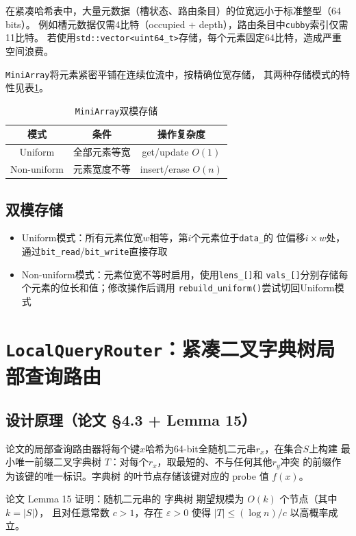 \documentclass[
    type = bachelor,
    fontset = win,
    decl-page = true,
  ]{njuthesis}
\begin{document}
在紧凑哈希表中，大量元数据（槽状态、路由条目）的位宽远小于标准整型（64 bits）。
例如槽元数据仅需4比特（occupied + depth），路由条目中\texttt{cubby}索引仅需11比特。
若使用\texttt{std::vector<uint64\_t>}存储，每个元素固定64比特，造成严重空间浪费。

\texttt{MiniArray}将元素紧密平铺在连续位流中，按精确位宽存储\cite{1}，
其两种存储模式的特性见表\ref{tab:miniarray}。

\begin{table}[H]
\centering
\begin{tabular}{c|c|c}
\toprule
模式 & 条件 & 操作复杂度 \\
\midrule
Uniform & 全部元素等宽 & get/update $O(1)$ \\
Non-uniform & 元素宽度不等 & insert/erase $O(n)$ \\
\bottomrule
\end{tabular}
\caption{\texttt{MiniArray}双模存储}
\label{tab:miniarray}
\end{table}

\subsection{双模存储}
\begin{itemize}
  \item Uniform模式：所有元素位宽$w$相等，第$i$个元素位于\texttt{data\_}的
    位偏移$i \times w$处，通过\texttt{bit\_read}/\texttt{bit\_write}直接存取
  \item Non-uniform模式：元素位宽不等时启用，使用\texttt{lens\_[]}和
    \texttt{vals\_[]}分别存储每个元素的位长和值；修改操作后调用
    \texttt{rebuild\_uniform()}尝试切回Uniform模式
\end{itemize}

\section{\texttt{LocalQueryRouter}：紧凑二叉字典树局部查询路由}

\subsection{设计原理（论文 \S4.3 + Lemma 15）}

论文\cite{1}的局部查询路由器将每个键$x$哈希为64-bit全随机二元串$r_x$，在集合$S$上构建
最小唯一前缀二叉字典树 $T$：对每个$r_x$，取最短的、不与任何其他$r_y$冲突
的前缀作为该键的唯一标识。字典树 的叶节点存储该键对应的 probe 值 $f(x)$。

论文 Lemma 15 证明：随机二元串的 字典树 期望规模为 $O(k)$ 个节点（其中 $k=|S|$），
且对任意常数 $c>1$，存在 $\varepsilon>0$ 使得 $|T|\leq (\log n)/c$ 以高概率成立。
\end{document}

